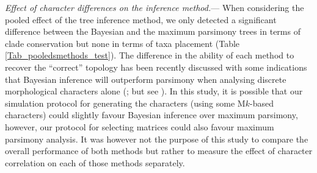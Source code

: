 \documentclass[12pt,letterpaper]{article}
\renewcommand{\subsubsection}[1]{%
\vspace{2ex}
\noindent
\textit{#1.}---}
\begin{document}
\subsubsection{Effect of character differences on the inference method}
When considering the pooled effect of the tree inference method, we only detected a significant difference between the Bayesian and the maximum parsimony trees in terms of clade conservation but none in terms of taxa placement (Table \ref{Tab_pooledsmethods_test}).
The difference in the ability of each method to recover the ``correct'' topology has been recently discussed with some indications that Bayesian inference will outperform parsimony when analysing discrete morphological characters alone (\citealt{wrightbayesian2014,OReilly20160081,puttick2017uncertain}; but see \citealt{spencerefficacy2013,goloboff2017weighted}).
In this study, it is possible that our simulation protocol for generating the characters (using some M$k$-based characters) could slightly favour Bayesian inference over maximum parsimony, however, our protocol for selecting matrices \citep[using matrices with a $CI>0.26$;][]{OReilly20160081} could also favour maximum parsimony analysis.
It was however not the purpose of this study to compare the overall performance of both methods but rather to measure the effect of character correlation on each of those methods separately.

\end{document}
